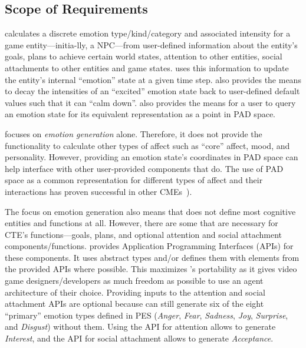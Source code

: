 \subsection{Scope of Requirements}\label{sec:doc_reqscope}
\progname{} calculates a discrete emotion type/kind/category and associated
intensity for a game entity---initia-lly, a NPC---from user-defined information
about the entity's goals, plans to achieve certain world states, attention to
other entities, social attachments to other entities and game states.
\progname{} uses this information to update the entity's internal ``emotion''
state at a given time step. \progname{} also provides the means to decay the
intensities of an ``excited'' emotion state back to user-defined default values
such that it can ``calm down''. \progname{} also provides the means for a user
to query an emotion state for its equivalent representation as a point in PAD
space.

\progname{} focuses on \textit{emotion generation} alone. Therefore, it does
not provide the functionality to calculate other types of affect such as
``core'' affect, mood, and personality. However, providing an emotion state's
coordinates in PAD space can help \progname{} interface with other
user-provided components that do. The use of PAD space as a common
representation for different types of affect and their interactions has proven
successful in other CMEs~\citep{broekens2004scalable, gebhard2005alma,
masuyama2018personality}).

The focus on emotion generation also means that \progname{} does not define
most cognitive entities and functions at all. However, there are some that are
necessary for CTE's functions---goals, plans, and optional attention and social
attachment components/functions. \progname{} provides Application Programming
Interfaces (APIs) for these components. It uses abstract types and/or defines
them with elements from the provided APIs where possible. This maximizes
\progname{}'s portability as it gives video game designers/developers as much
freedom as possible to use an agent architecture of their choice. Providing
inputs to the attention and social attachment APIs are optional because
\progname{} can still generate six of the eight ``primary'' emotion types
defined in PES (\textit{Anger}, \textit{Fear}, \textit{Sadness}, \textit{Joy},
\textit{Surprise}, and \textit{Disgust}) without them. Using the API for
attention allows \progname{} to generate \textit{Interest}, and the API for
social attachment allows \progname{} to generate \textit{Acceptance}.

